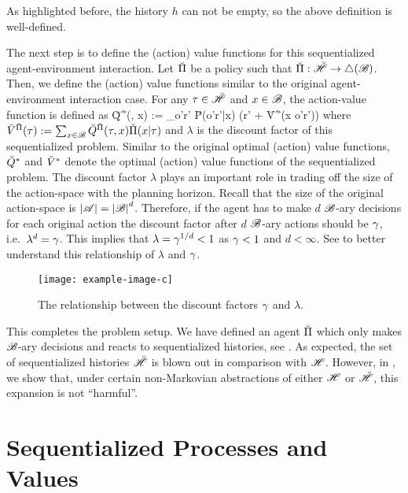 \documentclass{article} %
\begin{document}
As highlighted before, the history $h$ can not be empty, so the above definition is well-defined.

The next step is to define the (action) value functions for this sequentialized agent-environment interaction. Let $\breve{\Pi}$ be a policy such that $\breve{\Pi} : \breve{\mathscr{H}} \to \triangle(\mathscr{B})$. Then, we define the (action) value functions similar to the original agent-environment interaction case. For any $\tau \in \breve{\mathscr{H}}$ and $x \in \mathscr{B}$, the action-value function is defined as
\beq
\u Q^{\u \Pi}(\tau, x) := \sum_{o'r'} \u P(o'r'|\tau x) \left(r' + \lambda \u V^{\u \Pi}(\tau x o'r')\right)\label{eq:ube}
\eeq
where $\breve{V}^{\breve{\Pi}}(\tau) := \sum_{x \in \mathscr{B}} \breve{Q}^{\breve{\Pi}}(\tau, x)\breve{\Pi}(x|\tau)$ and $\lambda$ is the discount factor of this sequentialized problem. Similar to the original optimal (action) value functions, $\breve{Q}^*$ and $\breve{V}^*$ denote the optimal (action) value functions of the sequentialized problem. The discount factor $\lambda$ plays an important role in trading off the size of the action-space with the planning horizon. Recall that the size of the original action-space is ${\left\lvert\mathscr{A}\right\rvert} = {\left\lvert\mathscr{B}\right\rvert}^d$. Therefore, if the agent has to make $d$ $\mathscr{B}$-ary decisions for each original action the discount factor after $d$ $\mathscr{B}$-ary actions should be $\gamma$, i.e.\ $\lambda^d = \gamma$. This implies that $\lambda = \gamma^{1/d} < 1$ as $\gamma < 1$ and $d < \infty$.
\ifshort\else See  to better understand this relationship of $\lambda$ and $\gamma$.


\begin{figure}[!ht]
    \centering
    \texttt{[image: example-image-c]}
    \caption{The relationship between the discount factors $\gamma$ and $\lambda$.}
    \label{fig:relationship-discount-factors}
\end{figure}
\fi

This completes the problem setup. We have defined an agent $\breve{\Pi}$ which only makes $\mathscr{B}$-ary decisions and reacts to sequentialized histories, see . As expected, the set of sequentialized histories $\breve{\mathscr{H}}$ is blown out in comparison with $\mathscr{H}$. However, in , we show that, under certain non-Markovian abstractions of either $\mathscr{H}$ or $\breve{\mathscr{H}}$, this expansion is not ``harmful''.


\section{Sequentialized Processes and Values}\label{sec:bin-esa}
\end{document}
